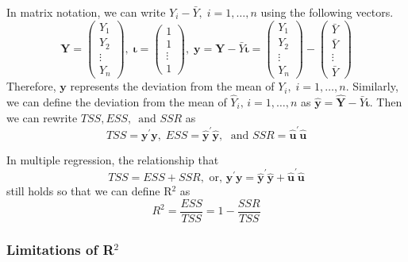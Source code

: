 \documentclass[a4paper,11pt]{article}
\begin{document}
In matrix notation, we can write \(Y_i - \bar{Y},\; i=1,\ldots,n\) using
the following vectors.
\begin{equation*}
\mathbf{Y} =
\begin{pmatrix}
Y_1 \\
Y_2 \\
\vdots \\
Y_n
\end{pmatrix},\;
\boldsymbol{\iota} =
\begin{pmatrix}
1 \\
1 \\
\vdots \\
1
\end{pmatrix},\;
\mathbf{y} = \mathbf{Y} - \bar{Y} \boldsymbol{\iota} =
\begin{pmatrix}
Y_1 \\
Y_2 \\
\vdots \\
Y_n
\end{pmatrix}
-
\begin{pmatrix}
\bar{Y} \\
\bar{Y} \\
\vdots \\
\bar{Y}
\end{pmatrix}
\end{equation*}
Therefore, \(\mathbf{y}\) represents the deviation from the mean of
\(Y_i,\; i=1,\ldots,n\). Similarly, we can define the deviation from the
mean of \(\hat{Y}_i,\, i=1, \ldots, n\) as \(\hat{\mathbf{y}} =
\hat{\mathbf{Y}} - \bar{Y} \boldsymbol{\iota}\). Then we can rewrite
\(TSS, ESS,\, \text{ and } SSR\) as
\[ TSS = \mathbf{y}^{\prime} \mathbf{y},\; ESS =
\hat{\mathbf{y}}^{\prime} \hat{\mathbf{y}},\; \text{ and } SSR =
\hat{\mathbf{u}}^{\prime} \hat{\mathbf{u}} \]

In multiple regression, the relationship that
\[ TSS = ESS + SSR, \text{ or, } \mathbf{y}^{\prime} \mathbf{y} =
\hat{\mathbf{y}}^{\prime} \hat{\mathbf{y}} + \hat{\mathbf{u}}^{\prime}
\hat{\mathbf{u}}\]
still holds so that we can define R\(^{\text{2}}\) as
\begin{equation}
\label{eq:r2-center}
R^2 = \frac{ESS}{TSS} = 1 - \frac{SSR}{TSS}
\end{equation}

\subsubsection*{Limitations of R\(^{\text{2}}\)}
\label{sec:orgce59faa}
\end{document}

